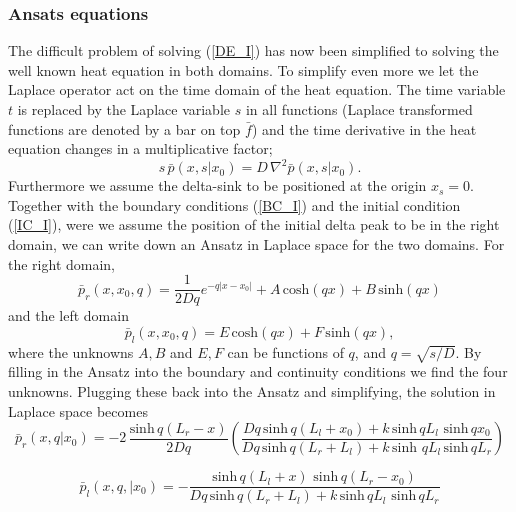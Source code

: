 \subsubsection{Ansats equations}

The difficult problem of solving (\ref{DE_I}) has now been simplified to solving the well known heat equation in both domains. To simplify even more we let the Laplace operator act on the time domain of the heat equation. The time variable $t$ is replaced by the Laplace variable $s$ in all functions (Laplace transformed functions are denoted by a bar on top $\bar{f}$) and the time derivative in the heat equation changes in a multiplicative factor;
\begin{equation}
 s \, \bar{p}(x,s|x_0) = D \, \nabla^2 \bar{p}(x,s|x_0).
\end{equation}
Furthermore we assume the delta-sink to be positioned at the origin $x_s=0$. Together with the boundary conditions (\ref{BC_I}) and the initial condition (\ref{IC_I}), were we assume the position of the initial delta peak to be in the right domain, we can write down an Ansatz in Laplace space for the two domains.
For the right domain,
\begin{equation}
 \bar{p}_r(x,x_0,q) = \frac{1}{2 D q} e^{-q |x-x_0|} + A \, \mathrm{cosh} (q x) + B \, \mathrm{sinh} (q x)
 \label{Anz_R}
\end{equation}
and the left domain
\begin{equation}
 \bar{p}_l(x,x_0,q) = E \, \mathrm{cosh} (q x) + F \, \mathrm{sinh} (q x),
\label{Anz_L}
\end{equation}
where the unknowns $A,B$ and $E,F$ can be functions of $q$, and $q=\sqrt{s/D}$. By filling in the Ansatz into the boundary and continuity conditions we find the four unknowns. Plugging these back into the Ansatz and simplifying, the solution in Laplace space becomes
\begin{equation}
 \bar{p}_r(x,q|x_0) = -2 \, \frac{\mathrm{sinh} \, q(L_r - x)}{2 D q} \left( \frac{Dq \, \mathrm{sinh} \, q(L_l + x_0) + k \, \mathrm{sinh} \, q L_l \,\, \mathrm{sinh} \, q x_0}{Dq \, \mathrm{sinh} \, q(L_r + L_l) + k \, \mathrm{sinh} \,\, q L_l \, \mathrm{sinh} \, q L_r} \right)
 \label{SOL_R}
\end{equation}

\begin{equation}
 \bar{p}_l(x,q,|x_0) = -\frac{\mathrm{sinh} \, q(L_l + x) \,\, \mathrm{sinh} \, q(L_r - x_0)}{Dq \, \mathrm{sinh} \, q(L_r + L_l) + k \, \mathrm{sinh} \, q L_l \,\, \mathrm{sinh} \, q L_r}
\label{SOL_L}
\end{equation}

